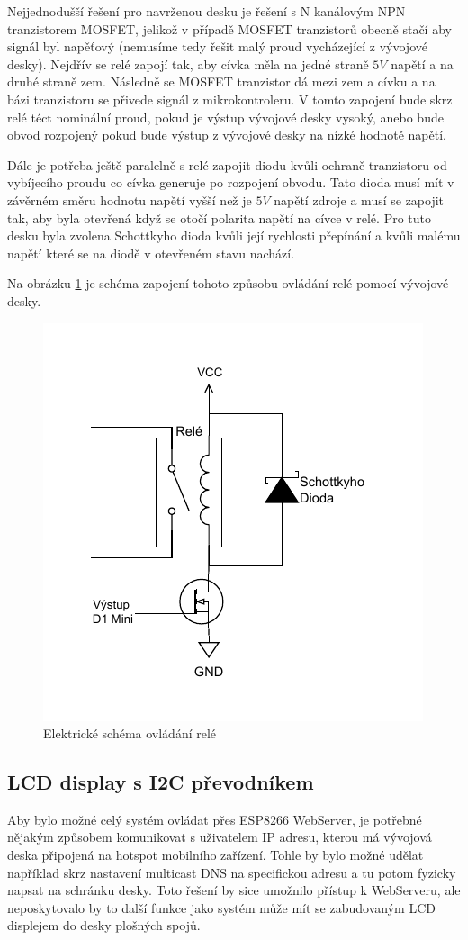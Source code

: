 Nejjednodušší řešení pro navrženou desku je řešení s N kanálovým NPN tranzistorem MOSFET, jelikož v případě MOSFET tranzistorů obecně stačí aby signál byl napěťový (nemusíme tedy řešit malý proud vycházející z vývojové desky). Nejdřív se relé zapojí tak, aby cívka měla na jedné straně $5V$ napětí a na druhé straně zem. Následně se MOSFET tranzistor dá mezi zem a cívku a na bázi tranzistoru se přivede signál z mikrokontroleru. V tomto zapojení bude skrz relé téct nominální proud, pokud je výstup vývojové desky vysoký, anebo bude obvod rozpojený pokud bude výstup z vývojové desky na nízké hodnotě napětí.

Dále je potřeba ještě paralelně s relé zapojit diodu kvůli ochraně tranzistoru od vybíjecího proudu co cívka generuje po rozpojení obvodu. Tato dioda musí mít v závěrném směru hodnotu napětí vyšší než je $5V$ napětí zdroje a musí se zapojit tak, aby byla otevřená když se otočí polarita napětí na cívce v relé. Pro tuto desku byla zvolena Schottkyho dioda kvůli její rychlosti přepínání a kvůli malému napětí které se na diodě v otevřeném stavu nachází.

Na obrázku \ref{fig:OvladaniRele} je schéma zapojení tohoto způsobu ovládání relé pomocí vývojové desky.

\begin{figure}[hptb]
	\centering
	\includegraphics[width=0.6\linewidth]{images/OvladaniRele.drawio.pdf}
	\caption{Elektrické schéma ovládání relé}
	\label{fig:OvladaniRele}
\end{figure}

\subsection{LCD display s I2C převodníkem}
Aby bylo možné celý systém ovládat přes ESP8266 WebServer, je potřebné nějakým způsobem komunikovat s uživatelem IP adresu, kterou má vývojová deska připojená na hotspot mobilního zařízení. Tohle by bylo možné udělat například skrz nastavení multicast DNS na specifickou adresu a tu potom fyzicky napsat na schránku desky. Toto řešení by sice umožnilo přístup k WebServeru, ale neposkytovalo by to další funkce jako systém může mít se zabudovaným LCD displejem do desky plošných spojů.

